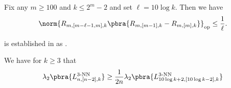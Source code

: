 \begin{theorem}\label{thm:nachtergaele hypothesis}
    Fix any $m\geq 100$ and $k\leq 2^m-2$ and set $\ell=10\log k$. Then we have
    \begin{align*}
        \norm{R_{m,[m-\ell-1,m],k}\pbra{R_{m,[m-1],k}-R_{m,[m],k}}}_{\mathrm{op}}\leq \frac1\ell.
    \end{align*}
\end{theorem}
 is established in  as .

\begin{corollary}\label{cor:reduce to logk}
    We have for $k\geq 3$ that 
    \begin{align*}
        \lambda_2\pbra{L_{n,[n-2],k}^{3\text{-NN}}}\geq \frac{1}{2n}\lambda_2\pbra{L_{10\log k+2,[10\log k-2],k}^{3\text{-NN}}}
    \end{align*}
\end{corollary}

